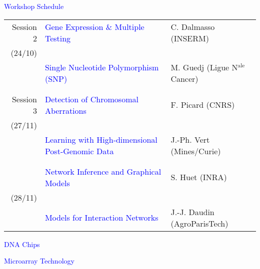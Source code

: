 \documentclass[dvips, lscape]{foils}
\newcommand{\textblue}[1]{\textcolor{blue}{#1}}
\newcommand{\emphase}[1]{\textblue{#1}}
\newcommand{\chapter}[1]{
  \addtocounter{chapter}{1}
  \setcounter{section}{0}
  \setcounter{subsection}{0}
  {\centerline{\LARGE \textblue{#1}}}
  }
\newcommand{\section}[1]{
  \addtocounter{section}{1}
  \setcounter{subsection}{0}
  {\centerline{\Large \textblue{#1}}}
  }
\begin{document}
\newpage
\chapter{Workshop Schedule} 
\bigskip
\vspace{1cm}

\noindent
\begin{tabular}{rp{12cm}l}
  Session 2  & \emphase{Gene Expression \& Multiple Testing} &
  C. Dalmasso (INSERM) \\
  (24/10) & \\
  & \emphase{Single Nucleotide Polymorphism (SNP)} & M. Guedj (Ligue N$^{\text{ale}}$ Cancer) \\
  \\
  \hline
  \\
  Session 3  & \emphase{Detection of Chromosomal Aberrations} & F. Picard
  (CNRS) \\
  (27/11) & \\
  & \emphase{Learning with High-dimensional Post-Genomic Data} & J.-Ph. Vert
  (Mines/Curie) \\
  \\
  \\
  & \emphase{Network Inference and Graphical Models} & S. Huet
  (INRA) \\
  (28/11) \\
  & \emphase{Models for Interaction Networks} & J.-J. Daudin (AgroParisTech) \\
\end{tabular}

\newpage
\chapter{DNA Chips} 
\bigskip

\section{Microarray Technology}
\end{document}
